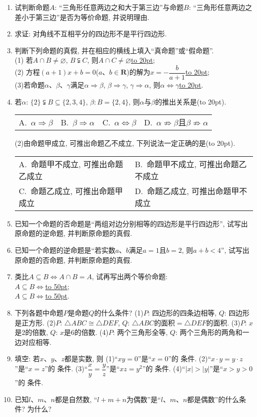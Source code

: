 \documentclass[10pt,a4paper]{article}
\newcommand{\blank}[1]{\underline{\hbox to #1pt{}}}
\newcommand{\bracket}[1]{(\hbox to #1pt{})}
\newcommand{\twoch}[4]{\par\begin{tabular}{p{.46\textwidth}p{.46\textwidth}}
A.~#1& B.~#2\\
C.~#3& D.~#4
\end{tabular}}
\newcommand{\fourch}[4]{\par\begin{tabular}{p{.23\textwidth}p{.23\textwidth}p{.23\textwidth}p{.23\textwidth}}
A.~#1 &B.~#2& C.~#3& D.~#4
\end{tabular}}
\begin{document}
\begin{enumerate}[1.]
\item 试判断命题$A$: ``三角形任意两边之和大于第三边''与命题$B$: ``三角形任意两边之差小于第三边''是否为等价命题, 并说明理由.
\item 求证: 对角线不互相平分的四边形不是平行四边形.
\item 判断下列命题的真假, 并在相应的横线上填入``真命题''或``假命题''.\\
(1) 若$A\cap B\ne \varnothing$, $B\subsetneqq C$, 则$A\cap C\ne \varnothing$\blank{20};\\
(2) 方程$(a+1)x+b=0$($a$、$b\in \mathbf{R}$)的解为$x=-\dfrac b{a+1}$\blank{20};\\
(3)若命题$\alpha$、$\beta$、$\gamma$满足$\alpha \Rightarrow \beta$, $\beta \Rightarrow \gamma$, $\gamma \Rightarrow \alpha$, 则$\alpha \Leftrightarrow \gamma$\blank{20}.
\item 若$\alpha$: $\{2\}\subsetneqq B\subseteq \{2,3,4\}$, $\beta :B=\{2,4\}$, 则$\alpha$与$\beta$的推出关系是\bracket{20}.
\fourch{$\alpha \Rightarrow \beta$}{$\beta \Rightarrow \alpha$}{$\alpha \Leftrightarrow \beta$}{$\alpha \not\Rightarrow \beta$且$\beta \not\Rightarrow \alpha$}
(2)由命题甲成立, 可推出命题乙不成立, 下列说法一定正确的是\bracket{20}.
\twoch{命题甲不成立, 可推出命题乙成立}{命题甲不成立, 可推出命题乙不成立}{命题乙成立, 可推出命题甲成立}{命题乙成立, 可推出命题甲不成立}
\item 已知一个命题的否命题是``两组对边分别相等的四边形是平行四边形'', 试写出原命题的逆命题, 并判断原命题的真假.
\item 已知一个命题的逆命题是``若实数$a$、$b$满足$a=1$且$b=2$, 则$a+b<4$'', 试写出原命题的否命题, 并判断原命题的真假.
\item 类比$A\subseteq B\Leftrightarrow A\cap B=A$, 试再写出两个等价命题:\\
$A\subseteq B\Leftrightarrow$\blank{50};\\
$A\subseteq B\Leftrightarrow$\blank{50}.
\item 下列各题中命题$P$是命题$Q$的什么条件?
(1)$P$: 四边形的四条边相等, 		$Q$: 四边形是正方形.
(2)$P$: $\triangle ABC\cong \triangle DEF$, 			$Q$: $\triangle ABC$的面积$=\triangle DEF$的面积.
(3)$P$: $x$是2的倍数, 				$Q$: $x$是6的倍数.
(4)$P$: 两个三角形全等, 			$Q$: 两个三角形的两角和一边对应相等.
\item 填空:
若$x$、$y$、$z$都是实数, 则
(1)``$xy=0$''是``$x=0$''的  条件.
(2)``$x\cdot y=y\cdot z$''是``$x=z$''的 条件.
(3)``$\dfrac xy=\dfrac yz$''是``$xz=y^2$''的 条件.
(4)``$|x|>|y|$''是``$x>y>0$''的 条件.
\item 已知$l$、$m$、$n$都是自然数, ``$l+m+n$为偶数''是``$l$、$m$、$n$都是偶数''的什么条件? 为什么?

\end{enumerate}
\end{document}
